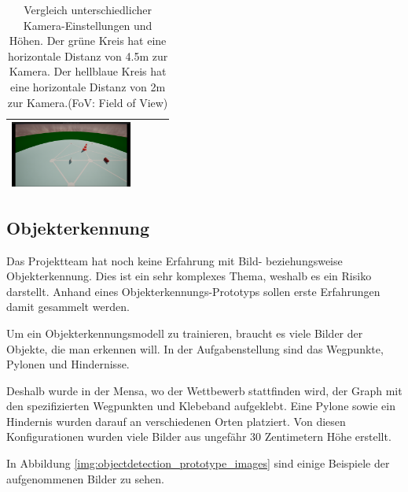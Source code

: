 \documentclass[../main.tex]{subfiles}
\begin{document}
\begin{table}[H]
\begin{tabular}{|c|c|c|c|}
        \includegraphics[width=4cm]{img/unrealengine/h75_f120_w45.png} \\
        \hline
    \end{tabular}
    \caption{Vergleich unterschiedlicher Kamera-Einstellungen und Höhen. Der grüne Kreis hat eine horizontale Distanz von 4.5m zur Kamera. Der hellblaue Kreis hat eine horizontale Distanz von 2m zur Kamera.(FoV: Field of View)}
\end{table}

\subsection{Objekterkennung}

Das Projektteam hat noch keine Erfahrung mit Bild- beziehungsweise Objekterkennung.  
Dies ist ein sehr komplexes Thema, weshalb es ein Risiko darstellt.  
Anhand eines Objekterkennungs-Prototyps sollen erste Erfahrungen damit gesammelt werden.

Um ein Objekterkennungsmodell zu trainieren, braucht es viele Bilder der Objekte, die man erkennen will. In der Aufgabenstellung sind das Wegpunkte, Pylonen und Hindernisse.

Deshalb wurde in der Mensa, wo der Wettbewerb stattfinden wird, der Graph mit den spezifizierten Wegpunkten und Klebeband aufgeklebt. Eine Pylone sowie ein Hindernis wurden darauf an verschiedenen Orten platziert. Von diesen Konfigurationen wurden viele Bilder aus ungefähr 30 Zentimetern Höhe erstellt.

In Abbildung \ref{img:objectdetection_prototype_images} sind einige Beispiele der aufgenommenen Bilder zu sehen.
\end{document}
